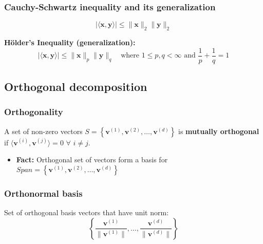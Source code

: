 \documentclass{article}
\begin{document}
        \subsubsection{Cauchy-Schwartz inequality and its generalization}
        \begin{definition}
                \begin{equation}
                    | \langle \mathbf{x}, \mathbf{y} \rangle | \leq \|\mathbf{x}\|_2 \|\mathbf{y}\|_2    
                \end{equation}
                \vspace{1em}

                \textbf{Hölder's Inequality (generalization):}
                \begin{equation}
                    | \langle \mathbf{x}, \mathbf{y} \rangle | \leq \|\mathbf{x}\|_p \|\mathbf{y}\|_q \quad \text{where } 1 \leq p, q < \infty \text{ and } \frac{1}{p} + \frac{1}{q} = 1
                \end{equation}
        \end{definition}

    \subsection{Orthogonal decomposition}
        \subsubsection{Orthogonality}
        \begin{definition}
            A set of non-zero vectors \( S = \left\{ \mathbf{v}^{(1)}, \mathbf{v}^{(2)}, \ldots, \mathbf{v}^{(d)} \right\} \) is \textbf{mutually orthogonal} if \( \langle \mathbf{v}^{(i)}, \mathbf{v}^{(j)} \rangle = 0 \) $\forall$ \( i \neq j \).
            \begin{itemize}
                \item \textbf{Fact:} Orthogonal set of vectors form a basis for \( Span = \left\{ \mathbf{v}^{(1)}, \mathbf{v}^{(2)}, \ldots, \mathbf{v}^{(d)} \right\} \)
            \end{itemize}
        \end{definition}

        \subsubsection{Orthonormal basis}
        \begin{definition}
            Set of orthogonal basis vectors that have unit norm:
            \[
            \left\{ \frac{\mathbf{v}^{(1)}}{\|\mathbf{v}^{(1)}\|}, \ldots, \frac{\mathbf{v}^{(d)}}{\|\mathbf{v}^{(d)}\|} \right\}
            \]
        \end{definition}
\end{document}

